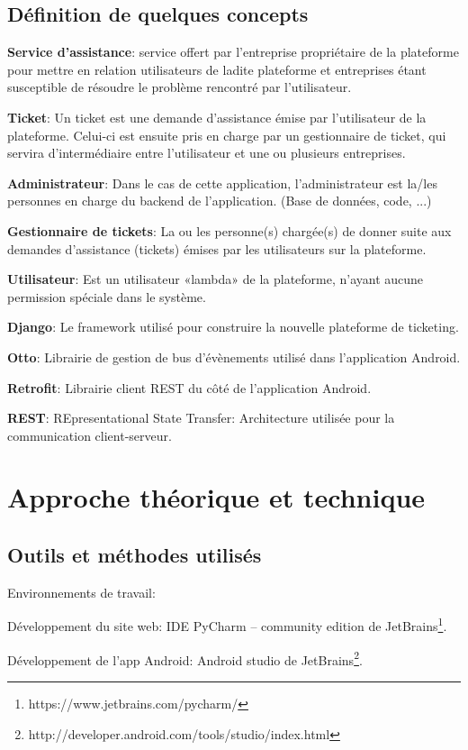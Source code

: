 \documentclass[12pt,table,a4paper]{report}
\begin{document}
\section{Définition de quelques concepts}
\textbf{Service d'assistance}: service offert par l'entreprise propriétaire de la plateforme pour mettre en relation utilisateurs de ladite plateforme et entreprises étant susceptible de résoudre le problème rencontré par l'utilisateur.

\textbf{Ticket}: Un ticket est une demande d'assistance émise par l'utilisateur de la plateforme. Celui-ci est ensuite pris en charge par un gestionnaire de ticket, qui servira d'intermédiaire entre l'utilisateur et une ou plusieurs entreprises.

\textbf{Administrateur}: Dans le cas de cette application, l'administrateur est la/les personnes en charge du backend de l'application. (Base de données, code, ...)

\textbf{Gestionnaire de tickets}: La ou les personne(s) chargée(s) de donner suite aux demandes d'assistance (tickets) émises par les utilisateurs sur la plateforme.

\textbf{Utilisateur}: Est un utilisateur «lambda» de la plateforme, n'ayant aucune permission spéciale dans le système.

\textbf{Django}: Le framework utilisé pour construire la nouvelle plateforme de ticketing.

\textbf{Otto}: Librairie de gestion de bus d'évènements utilisé dans l'application Android.

\textbf{Retrofit}: Librairie client REST du côté de l'application Android.

\textbf{REST}: REpresentational State Transfer: Architecture utilisée pour la communication client-serveur.

\chapter{Approche théorique et technique}
\section{Outils et méthodes utilisés}
Environnements de travail:

Développement du site web: IDE PyCharm – community edition de JetBrains\footnote{https://www.jetbrains.com/pycharm/}.

Développement de l'app Android: Android studio de JetBrains\footnote{http://developer.android.com/tools/studio/index.html}.
\end{document}
